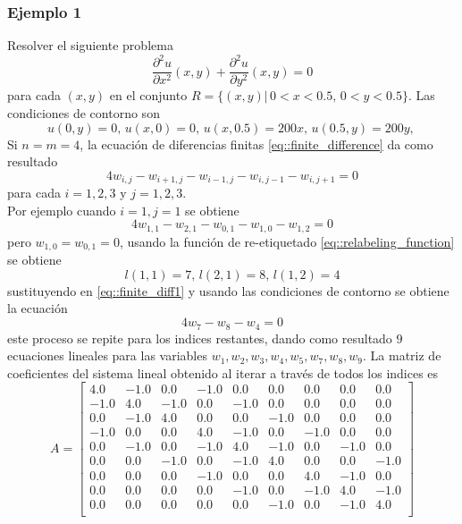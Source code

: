 \documentclass[a4paper]{article}
\begin{document}
\subsubsection{Ejemplo 1}
Resolver el siguiente problema 
\begin{equation}
\frac{\partial^2 u}{\partial x^2}(x,y)+\frac{\partial^2 u}{\partial y^2}(x,y)=0
\end{equation}
para cada $(x,y)$ en el conjunto $R=\{ (x,y)|\, 0<x<0.5,\, 0<y<0.5 \}$. Las condiciones de contorno  son 
\begin{equation*}
u(0,y)=0,\,u(x,0)=0,\, u(x,0.5)=200x,\, u(0.5,y)=200y,\,
\end{equation*}
Si $n=m=4$, la ecuación de diferencias finitas \ref{eq::finite_difference} da como resultado
\begin{equation}
4w_{i,j}-w_{i+1,j}-w_{i-1,j}-w_{i,j-1}-w_{i,j+1}=0
\end{equation}
para cada $i=1,2,3$ y $j=1,2,3$.\\
Por ejemplo cuando $i=1,j=1$ se obtiene
\begin{equation}\label{eq::finite_diff1}
4w_{1,1}-w_{2,1}-w_{0,1}-w_{1,0}-w_{1,2}=0
\end{equation}
pero $w_{1,0}=w_{0,1}=0$, usando la función de re-etiquetado \ref{eq::relabeling_function}  se obtiene
\begin{equation*}
l(1,1)=7,\,l(2,1)=8,\,l(1,2)=4
\end{equation*}
sustituyendo en \ref{eq::finite_diff1} y usando las condiciones de contorno se obtiene la ecuación
\begin{equation*}
4w_{7}-w_{8}-w_{4}=0
\end{equation*}
este proceso se repite para los indices restantes, dando como resultado $9$ ecuaciones lineales para las variables $w_1,w_2,w_3,w_4,w_5,w_7,w_8,w_9$. La matriz de coeficientes del sistema lineal obtenido al iterar a través de todos los indices es 
\begin{equation}\label{eq::block_tridiagonal_matrix_1}
A =
\begin{bmatrix}
4.0 & -1.0 & 0.0 & -1.0 & 0.0 & 0.0 & 0.0 & 0.0 & 0.0 \\
-1.0 & 4.0 & -1.0 & 0.0 & -1.0 & 0.0 & 0.0 & 0.0 & 0.0 \\
0.0 & -1.0 & 4.0 & 0.0 & 0.0 & -1.0 & 0.0 & 0.0 & 0.0 \\
-1.0 & 0.0 & 0.0 & 4.0 & -1.0 & 0.0 & -1.0 & 0.0 & 0.0 \\
0.0 & -1.0 & 0.0 & -1.0 & 4.0 & -1.0 & 0.0 & -1.0 & 0.0 \\
0.0 & 0.0 & -1.0 & 0.0 & -1.0 & 4.0 & 0.0 & 0.0 & -1.0 \\
0.0 & 0.0 & 0.0 & -1.0 & 0.0 & 0.0 & 4.0 & -1.0 & 0.0 \\
0.0 & 0.0 & 0.0 & 0.0 & -1.0 & 0.0 & -1.0 & 4.0 & -1.0 \\
0.0 & 0.0 & 0.0 & 0.0 & 0.0 & -1.0 & 0.0 & -1.0 & 4.0 \\
\end{bmatrix}
\end{equation}
\end{document}
